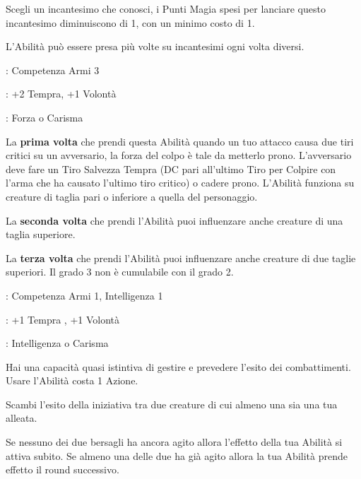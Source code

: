 \begin{multicols}{2}
Scegli un incantesimo che conosci, i Punti Magia spesi per lanciare questo incantesimo diminuiscono di 1, con un minimo costo di 1.

L'Abilità può essere presa più volte su incantesimi ogni volta diversi.

\begin{description}[noitemsep, topsep=0pt, parsep=0pt, partopsep=0pt, leftmargin=0cm, labelwidth=2.5cm]
    \item[\textbf{Requisito}]: Competenza Armi 3
    \item[\textbf{Tiri Salvezza}]: +2 Tempra, +1 Volontà
    \item[\textbf{Caratteristica}]: Forza o Carisma
\end{description}

La \textbf{prima volta} che prendi questa Abilità quando un tuo attacco causa due tiri critici su un avversario, la forza del colpo è tale da metterlo prono. L'avversario deve fare un Tiro Salvezza Tempra (DC pari all'ultimo Tiro per Colpire con l'arma che ha causato l'ultimo tiro critico) o cadere prono. L'Abilità funziona su creature di taglia pari o inferiore a quella del personaggio.

La \textbf{seconda volta} che prendi l'Abilità puoi influenzare anche creature di una taglia superiore.

La \textbf{terza volta} che prendi l'Abilità puoi influenzare anche creature di due taglie superiori. Il grado 3 non è cumulabile con il grado 2.

\begin{description}[noitemsep, topsep=0pt, parsep=0pt, partopsep=0pt, leftmargin=0cm, labelwidth=2.5cm]
    \item[\textbf{Requisito}]: Competenza Armi 1, Intelligenza 1
    \item[\textbf{Tiri Salvezza}]: +1 Tempra , +1 Volontà
    \item[\textbf{Caratteristica}]: Intelligenza o Carisma
\end{description}

Hai una capacità quasi istintiva di gestire e prevedere l'esito dei combattimenti. Usare l'Abilità costa 1 Azione.

Scambi l'esito della iniziativa tra due creature di cui almeno una sia una tua alleata.

Se nessuno dei due bersagli ha ancora agito allora l'effetto della tua Abilità si attiva subito. Se almeno una delle due ha già agito allora la tua Abilità prende effetto il round successivo.


\end{multicols}

